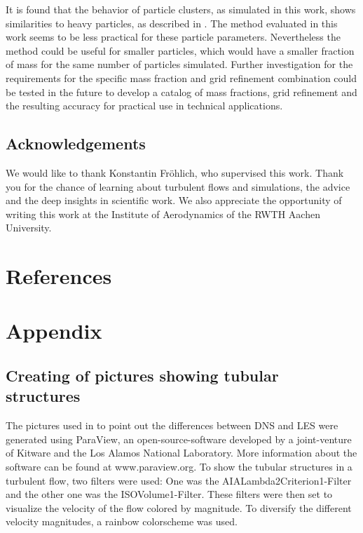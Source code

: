\documentclass[11pt,a4paper,openany,oneside,parskip=half*]{article}
\begin{document}
It is found that the behavior of particle clusters, as simulated in this work, shows similarities to heavy particles, as described in \cite{Schneiders2017}.
\newline
The method evaluated in this work seems to be less practical for these particle parameters. Nevertheless the method could be useful for smaller particles, which would have a smaller fraction of mass for the same number of particles simulated. Further investigation for the requirements for the specific mass fraction and grid refinement combination could be tested in the future to develop a catalog of mass fractions, grid refinement and the resulting accuracy for practical use in technical applications. 
\subsection*{Acknowledgements}
We would like to thank Konstantin Fr\"ohlich, who supervised this work. Thank you for the chance of learning about turbulent flows and simulations, the advice and the deep insights in scientific work. We also appreciate the opportunity of writing this work at the Institute of Aerodynamics of the RWTH Aachen University.
\pagebreak
\section{References}
\vspace*{-1.2cm}
\nocite{*} %
\pagebreak
\section{Appendix}
\subsection*{Creating of pictures showing tubular structures}
The pictures used in to point out the differences between DNS and LES were generated using ParaView, an open-source-software developed by a joint-venture of Kitware and the Los Alamos National Laboratory. More information about the software can be found at www.paraview.org. To show the tubular structures in a turbulent flow, two filters were used: One was the AIALambda2Criterion1-Filter and the other one was the ISOVolume1-Filter. These filters were then set to visualize the velocity of the flow colored by magnitude. To diversify the different velocity magnitudes, a rainbow colorscheme was used. 
\end{document}
